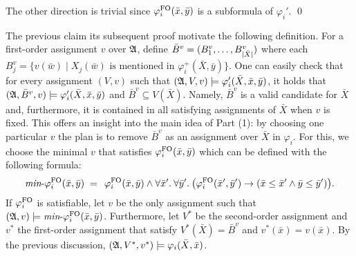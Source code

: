 The other direction is trivial since $\varphi^{{\rm FO}}_i(\bar{x},\bar{y})$ is a subformula of $\varphi_i'$.
\qed

The previous claim its subsequent proof motivate the following definition. For a first-order assignment $v$ over $\mathfrak{A}$, define $\bar{B}^v = (B^v_1,\ldots,B^v_{\vert \bar{X} \vert})$ where each $B^v_j = \{v(\bar{w}) \mid \text{$X_j(\bar{w})$ is mentioned in $\varphi^{+}_i(\bar{X},\bar{y})$}\}$.
One can easily check that for every assignment $(V, v)$ such that $(\mathfrak{A},V,v)\models \varphi_i'(\bar{X}, \bar{x}, \bar{y})$, it holds that $(\mathfrak{A},\bar{B}^v,v)\models \varphi_i'(\bar{X}, \bar{x}, \bar{y})$ and $\bar{B}^v \subseteq V(\bar{X})$.
Namely, $\bar{B}^v$ is a valid candidate for $\bar{X}$ and, furthermore, it is contained in all satisfying assignments of $\bar{X}$ when $v$ is fixed.
This offers an insight into the main idea of Part (1): by choosing one particular $v$ the plan is to remove $\bar{B}^v$ as an assignment over $\bar{X}$ in $\varphi_i$. 
For this, we choose the minimal $v$ that satisfies $\varphi^{{\rm FO}}_i(\bar{x},\bar{y})$ which can be defined with the following formula:
\[
\text{{\it min}-}\varphi^{{\rm FO}}_i(\bar{x}, \bar{y}) \; = \;  \,\varphi_i^{{\rm FO}}(\bar{x},\bar{y})\wedge \forall{\bar{x}'}.\: \forall{\bar{y}'}.\:\big(\varphi_i^{{\rm FO}}(\bar{x}',\bar{y}')\to ( \bar{x}\leq\bar{x}' \wedge  \bar{y}\leq\bar{y}')\big).
\] 
If $\varphi^{{\rm FO}}_i$ is satisfiable, let $v$ be the only assignment such that  $(\mathfrak{A},v)\models \text{{\it min}-}\varphi^{{\rm FO}}_i(\bar{x}, \bar{y})$. 
Furthermore, let $V^*$ be the second-order assignment and $v^*$ the first-order assignment that satisfy $V^*(\bar{X}) = \bar{B}^{v}$ and $v^*(\bar{x}) = v(\bar{x})$.
By the previous discussion, $(\mathfrak{A},V^*,v^*)\models\varphi_i(\bar{X},\bar{x})$.

